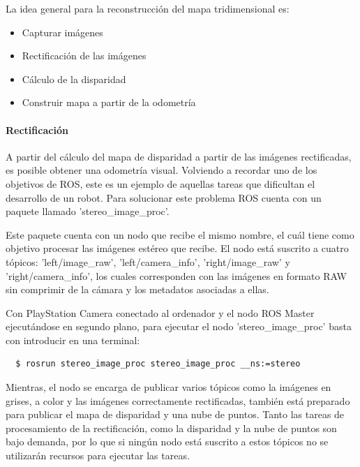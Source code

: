 
La idea general para la reconstrucción del mapa tridimensional es:

\begin{itemize}
  \item Capturar imágenes
  \item Rectificación de las imágenes
  \item Cálculo de la disparidad
  \item Construir mapa a partir de la odometría
\end{itemize}

\paragraph{Rectificación} \hspace{0pt}

A partir del cálculo del mapa de disparidad a partir de las imágenes
rectificadas, es posible obtener una odometría visual. Volviendo a recordar uno
de los objetivos de ROS, este es un ejemplo de aquellas tareas que dificultan el
desarrollo de un robot. Para solucionar este problema ROS cuenta con un paquete
llamado 'stereo\_image\_proc'.

Este paquete cuenta con un nodo que recibe el mismo nombre, el cuál tiene como
objetivo procesar las imágenes estéreo que recibe. El nodo está suscrito a
cuatro tópicos: 'left/image\_raw', 'left/camera\_info', 'right/image\_raw' y
'right/camera\_info', los cuales corresponden con las imágenes en formato RAW
sin comprimir de la cámara y los metadatos asociadas a ellas.

Con PlayStation Camera conectado al ordenador y el nodo ROS Master ejecutándose
en segundo plano, para ejecutar el nodo 'stereo\_image\_proc' basta con
introducir en una terminal:
\\
\begin{lstlisting}
  $ rosrun stereo_image_proc stereo_image_proc __ns:=stereo
\end{lstlisting}

Mientras, el nodo se encarga de publicar varios tópicos como la imágenes en
grises, a color y las imágenes correctamente rectificadas, también está
preparado para publicar el mapa de disparidad y una nube de puntos. Tanto las
tareas de procesamiento de la rectificación, como la disparidad y la nube de
puntos son bajo demanda, por lo que si ningún nodo está suscrito a estos tópicos
no se utilizarán recursos para ejecutar las tareas.


